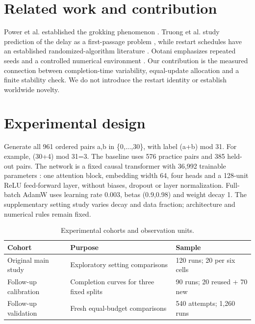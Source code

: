 \documentclass[conference,letterpaper]{IEEEtran}
\begin{document}
\section{Related work and contribution}

Power et al. established the grokking phenomenon \cite{ref1}. Truong et al. study prediction of the delay as a first-passage problem \cite{ref2}, while restart schedules have an established randomized-algorithm literature \cite{ref3}. Ootani emphasizes repeated seeds and a controlled numerical environment \cite{ref4}. Our contribution is the measured connection between completion-time variability, equal-update allocation and a finite stability check. We do not introduce the restart identity or establish worldwide novelty.

\section{Experimental design}

Generate all 961 ordered pairs a,b in \{0,...,30\}, with label (a+b) mod 31. For example, (30+4) mod 31=3. The baseline uses 576 practice pairs and 385 held-out pairs. The network is a fixed causal transformer with 36,992 trainable parameters \cite{ref6}: one attention block, embedding width 64, four heads and a 128-unit ReLU feed-forward layer, without biases, dropout or layer normalization. Full-batch AdamW \cite{ref5} uses learning rate 0.003, betas (0.9,0.98) and weight decay 1. The supplementary setting study varies decay and data fraction; architecture and numerical rules remain fixed.

\begin{table}[!t]

\caption{Experimental cohorts and observation units.}

\centering\footnotesize

\begin{tabularx}{\textwidth}{XXX}

\toprule

Cohort & Purpose & Sample\\

\midrule

Original main study & Exploratory setting comparisons & 120 runs; 20 per six cells\\

Follow-up calibration & Completion curves for three fixed splits & 90 runs; 20 reused + 70 new\\

Follow-up validation & Fresh equal-budget comparisons & 540 attempts; 1,260 runs\\

\bottomrule

\end{tabularx}

\end{table}
\end{document}
